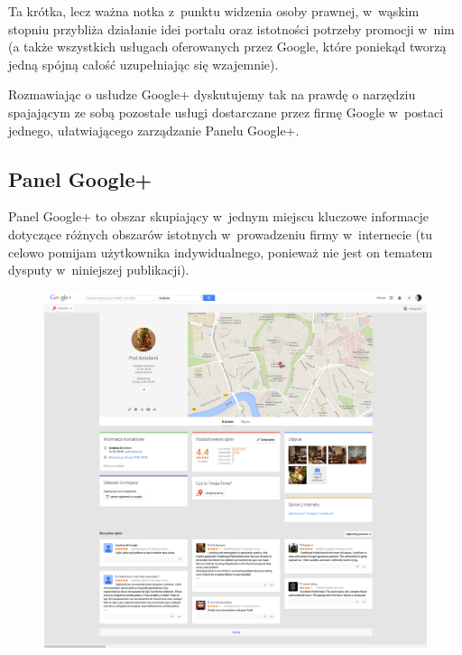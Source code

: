 Ta krótka, lecz ważna notka z~punktu widzenia osoby prawnej, w~wąskim stopniu przybliża działanie idei portalu oraz istotności potrzeby promocji w~nim (a także wszystkich usługach oferowanych przez Google, które poniekąd tworzą jedną spójną całość uzupełniając się wzajemnie). 

Rozmawiając o usłudze Google+ dyskutujemy tak na prawdę o narzędziu spajającym ze sobą pozostałe usługi dostarczane przez firmę Google w~postaci jednego, ułatwiającego zarządzanie Panelu Google+.


\subsection{Panel Google+}
Panel Google+ to obszar skupiający w~jednym miejscu kluczowe informacje dotyczące różnych obszarów istotnych w~prowadzeniu firmy w~internecie (tu celowo pomijam użytkownika indywidualnego, ponieważ nie jest on tematem dysputy w~niniejszej publikacji).\\

\begin{figure}[!h]
\centering
    \scalebox{0.21}
    {
        \includegraphics{images/pod-aniolami-google-plus.png}
    }
    \label{fig:sample-google-plus-company-profile-page}
\end{figure}

